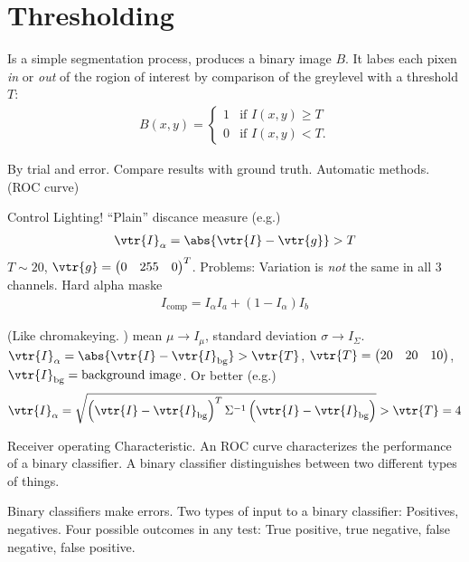 \section{Thresholding}
Is a simple segmentation process, produces a binary image $B$. It labes each pixen \emph{in} or \emph{out} of the rogion of interest by comparison of the greylevel with a threshold $T$:
\begin{gather*}
	B(x,y)=
	\begin{cases}
		1&\text{if }I(x,y)\geq T\\
		0&\text{if }I(x,y)<T.
	\end{cases}
\end{gather*}
\begin{compactdesc}
	\item[\lp{Choosing $T$}] By trial and error. Compare results with ground truth. Automatic methods. (ROC curve)
	\item[\lp{Chromakeying}] Control Lighting! ``Plain'' discance measure (e.g.)
		\begin{gather*}
			\vtr{I}_{\alpha}=\abs{\vtr{I}-\vtr{g}}>T
		\end{gather*}
		$T\sim 20$, $\vtr{g}=
		\begin{pmatrix}
			0&255&0
		\end{pmatrix}^{T}
		$. Problems: Variation is \emph{not} the same in all 3 channels. Hard alpha maske
		\begin{gather*}
			I_{\text{comp}}=I_{\alpha}I_{a}+\left( 1-I_{\alpha} \right)I_b
		\end{gather*}
	\item[\lp{Gaussian model per pixel}] (Like chromakeying. ) mean $\mu\to I_{\mu}$, standard deviation $\sigma\to I_{\Sigma}$. $\vtr{I}_{\alpha}=\abs{\vtr{I}-\vtr{I}_{\text{bg}}}>\vtr{T}$, $\vtr{T}=
		\begin{pmatrix}
			20&20&10
		\end{pmatrix}
		$, $\vtr{I}_{\text{bg}}=\text{background image}$. Or better (e.g.)
		\begin{gather*}
			\vtr{I}_{\alpha}=\sqrt{\left( \vtr{I}-\vtr{I}_{\text{bg}} \right)^T\Sigma^{-1}\left( \vtr{I}-\vtr{I}_{\text{bg}} \right)}>\vtr{T}=4
		\end{gather*}
	\item[\lp{ROC Analysis}] Receiver operating Characteristic. An ROC curve characterizes the performance of a binary classifier. A binary classifier distinguishes between two different types of things.
	\item[\lp{Classification error}] Binary classifiers make errors. Two types of input to a binary classifier: Positives, negatives. Four possible outcomes in any test: True positive, true negative, false negative, false positive.

\end{compactdesc}
